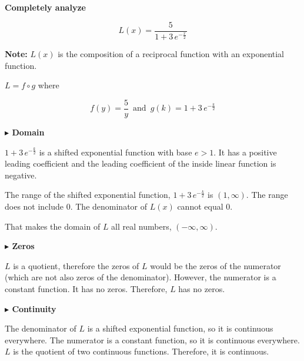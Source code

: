 \documentclass{ximera}
\begin{document}
\begin{example}

\textbf{\textcolor{purple!85!blue}{Completely analyze}} 


\[   L(x) = \frac{5}{1 + 3 \, e^{-\tfrac{x}{2}}} \]




\textbf{Note:} $L(x)$ is the composition of a reciprocal function with an exponential function.

$L = f \circ g$ where

\[  f(y) =  \frac{5}{y}  \, \text{ and } \, g(k) = 1 + 3 \, e^{-\tfrac{k}{2}}    \]




\textbf{\textcolor{blue!55!black}{$\blacktriangleright$ Domain}} 

$1 + 3 \, e^{-\tfrac{k}{2}}$ is a shifted exponential function with base $e > 1$.  It has a positive leading coefficient and the leading coefficient of the inside linear function is negative. 



The range of the shifted exponential function, $1 + 3 \, e^{-\tfrac{k}{2}}$ is $(1, \infty)$. The range does not include $0$. The denominator of $L(x)$ cannot equal $0$.  


 That makes the domain of $L$ all real numbers, $(-\infty, \infty)$.














\textbf{\textcolor{blue!55!black}{$\blacktriangleright$ Zeros}} 



$L$ is a quotient, therefore the zeros of $L$ would be the zeros of the numerator (which are not also zeros of the denominator).  However, the numerator is a constant function.  It has no zeros. Therefore, $L$ has no zeros.










\textbf{\textcolor{blue!55!black}{$\blacktriangleright$ Continuity}} 


The denominator of $L$ is a shifted exponential function, so it is continuous everywhere. The numerator is a constant function, so it is continuous everywhere.  $L$ is the quotient of two continuous functions.  Therefore, it is continuous. 



\end{example}
\end{document}
